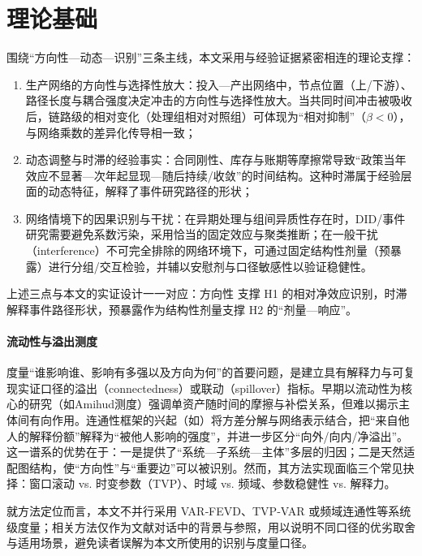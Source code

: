 \section{理论基础}
围绕“方向性—动态—识别”三条主线，本文采用与经验证据紧密相连的理论支撑：
\begin{enumerate}
  \item 生产网络的方向性与选择性放大：投入—产出网络中，节点位置（上/下游）、路径长度与耦合强度决定冲击的方向性与选择性放大\citep{acemoglu2012network,carvalho2014micro}。当共同时间冲击被吸收后，链路级的相对变化（处理组相对对照组）可体现为“相对抑制”（$\beta<0$），与网络乘数的差异化传导相一致；
  \item 动态调整与时滞的经验事实：合同刚性、库存与账期等摩擦常导致“政策当年效应不显著—次年起显现—随后持续/收敛”的时间结构。这种时滞属于经验层面的动态特征，解释了事件研究路径的形状；
  \item 网络情境下的因果识别与干扰：在异期处理与组间异质性存在时，DID/事件研究需要避免系数污染，采用恰当的固定效应与聚类推断\citep{sun2021event,bertrand2004much,cameron2015practitioner,angrist2009mostly}；在一般干扰（interference）不可完全排除的网络环境下，可通过固定结构性剂量（预暴露）进行分组/交互检验，并辅以安慰剂与口径敏感性以验证稳健性\citep{aronow2017interference,athey2018network}。
\end{enumerate}

上述三点与本文的实证设计一一对应：方向性 \II 支撑 H1 的相对净效应识别，时滞解释事件路径形状，预暴露作为结构性剂量支撑 H2 的“剂量—响应”。
\paragraph{流动性与溢出测度}
度量“谁影响谁、影响有多强以及方向为何”的首要问题，是建立具有解释力与可复现实证口径的溢出（connectedness）或联动（spillover）指标。早期以流动性为核心的研究（如Amihud测度）强调单资产随时间的摩擦与补偿关系，但难以揭示主体间有向作用。连通性框架的兴起（如\citep{billio2012econometric,diebold2012better,diebold2014connectedness}）将方差分解与网络表示结合，把“来自他人的解释份额”解释为“被他人影响的强度”，并进一步区分“向外/向内/净溢出”。这一谱系的优势在于：一是提供了“系统—子系统—主体”多层的归因；二是天然适配图结构，使“方向性”与“重要边”可以被识别。然而，其方法实现面临三个常见抉择：窗口滚动 vs. 时变参数（TVP）、时域 vs. 频域、参数稳健性 vs. 解释力。

就方法定位而言，本文不并行采用 VAR‑FEVD、TVP‑VAR 或频域连通性等系统级度量；相关方法仅作为文献对话中的背景与参照，用以说明不同口径的优劣取舍与适用场景，避免读者误解为本文所使用的识别与度量口径。

